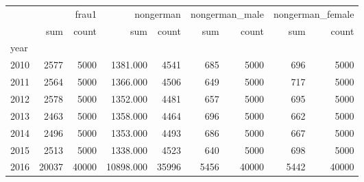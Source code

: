 \begin{tabular}{lrrrrrrrr}
\toprule
 & \multicolumn{2}{r}{frau1} & \multicolumn{2}{r}{nongerman} & \multicolumn{2}{r}{nongerman_male} & \multicolumn{2}{r}{nongerman_female} \\
 & sum & count & sum & count & sum & count & sum & count \\
year &  &  &  &  &  &  &  &  \\
\midrule
2010 & 2577 & 5000 & 1381.000 & 4541 & 685 & 5000 & 696 & 5000 \\
2011 & 2564 & 5000 & 1366.000 & 4506 & 649 & 5000 & 717 & 5000 \\
2012 & 2578 & 5000 & 1352.000 & 4481 & 657 & 5000 & 695 & 5000 \\
2013 & 2463 & 5000 & 1358.000 & 4464 & 696 & 5000 & 662 & 5000 \\
2014 & 2496 & 5000 & 1353.000 & 4493 & 686 & 5000 & 667 & 5000 \\
2015 & 2513 & 5000 & 1338.000 & 4523 & 640 & 5000 & 698 & 5000 \\
2016 & 20037 & 40000 & 10898.000 & 35996 & 5456 & 40000 & 5442 & 40000 \\
\bottomrule
\end{tabular}
